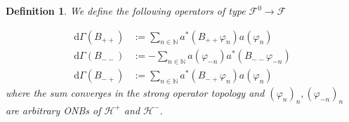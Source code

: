 \documentclass[b5paper,draft,openbib,12pt]{memoir}
\newtheorem{Def}{Definition}[section]
\begin{document}
\begin{Def}
We define the following operators of type \(\mathcal{F}^0\rightarrow \mathcal{F}\)

\begin{align}\label{predefdGamma}
\mathrm{d}\Gamma(B_{++})&:= \sum_{n\in\mathbb{N}}  a^*(B_{++} \varphi_n) a(\varphi_n) \\
\mathrm{d}\Gamma(B_{--})&:= -\sum_{n\in\mathbb{N}}   a(\varphi_{-n})a^*(B_{--} \varphi_{-n}) \\
\mathrm{d}\Gamma(B_{-+})&:= \sum_{n\in\mathbb{N}}  a^*(B_{-+}\varphi_{n}) a(\varphi_n)
\end{align}
where the sum converges in the strong operator topology and \((\varphi_n)_n , (\varphi_{-n})_n\) are arbitrary ONBs of \(\mathcal{H}^+\) and \(\mathcal{H}^-\).
\end{Def}
\end{document}
